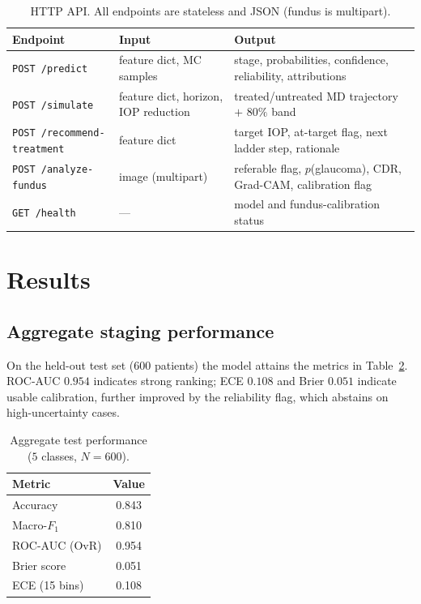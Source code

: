 \documentclass[10pt,twocolumn]{article}
\begin{document}
\begin{table}[t]
\centering
\caption{HTTP API. All endpoints are stateless and JSON (fundus is multipart).}
\label{tab:api}
\small
\begin{tabular}{lll}
\toprule
Endpoint & Input & Output \\
\midrule
\texttt{POST /predict} & feature dict, MC samples & stage, probabilities, confidence, reliability, attributions \\
\texttt{POST /simulate} & feature dict, horizon, IOP reduction & treated/untreated MD trajectory $+$ $80\%$ band \\
\texttt{POST /recommend-treatment} & feature dict & target IOP, at-target flag, next ladder step, rationale \\
\texttt{POST /analyze-fundus} & image (multipart) & referable flag, $p$(glaucoma), CDR, Grad-CAM, calibration flag \\
\texttt{GET /health} & --- & model and fundus-calibration status \\
\bottomrule
\end{tabular}
\end{table}

\section{Results}
\label{sec:results}

\subsection{Aggregate staging performance}
On the held-out test set ($600$ patients) the model attains the metrics in
Table~\ref{tab:tabular}. ROC-AUC $0.954$ indicates strong ranking; ECE $0.108$ and
Brier $0.051$ indicate usable calibration, further improved by the reliability flag,
which abstains on high-uncertainty cases.

\begin{table}[t]
\centering
\caption{Aggregate test performance ($5$ classes, $N{=}600$).}
\label{tab:tabular}
\small
\begin{tabular}{lc}
\toprule
Metric & Value \\
\midrule
Accuracy & 0.843 \\ Macro-$F_1$ & 0.810 \\ ROC-AUC (OvR) & 0.954 \\
Brier score & 0.051 \\ ECE (15 bins) & 0.108 \\
\bottomrule
\end{tabular}
\end{table}
\end{document}
